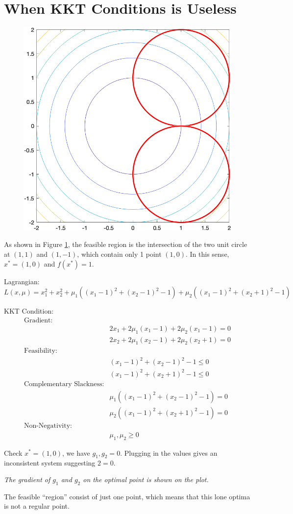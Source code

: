 \section{When KKT Conditions is Useless}
\begin{figure}[h]
    \centering
    \includegraphics[width=0.5\linewidth]{hw7/prob6_plot.png}
    \label{fig:hw7_prob6_circle}
\end{figure}
As shown in Figure \ref{fig:hw7_prob6_circle}, the feasible region is the intersection of the two unit circle at $(1, 1)$ and $(1, -1)$, which contain only 1 point $(1, 0)$. In this sense, $x^*=(1, 0)$ and $f(x^*) = 1$.
\par Lagrangian:
\[
L(x, \mu) = x_1^2 + x_2^2 + \mu_1((x_1 -1)^2 + (x_2 - 1)^2 - 1) + \mu_2((x_1 -1)^2 + (x_2 + 1)^2 - 1)
\]
\par KKT Condition:
\begin{align*}
\text{Gradient:}&\\
&2x_1 + 2\mu_1(x_1 - 1) + 2\mu_2 (x_1 - 1) = 0 \\
&2x_2 + 2\mu_1(x_2 - 1) + 2\mu_2(x_2 + 1) = 0 \\
\text{Feasibility:}&\\
&(x_1 -1)^2 + (x_2 - 1)^2 - 1 \leq 0\\
&(x_1 -1)^2 + (x_2 + 1)^2 - 1 \leq 0\\
\text{Complementary Slackness:}&\\
&\mu_1((x_1 -1)^2 + (x_2 - 1)^2 - 1) = 0\\
&\mu_2((x_1 -1)^2 + (x_2 + 1)^2 - 1) = 0 \\
\text{Non-Negativity:}&\\
&\mu_1, \mu_2 \geq 0
\end{align*}

Check $x^* = (1, 0)$, we have $g_1, g_2 = 0$. Plugging in the values gives an inconsistent system suggesting $2 = 0$. 
\par \textit{The gradient of $g_1$ and $g_2$ on the optimal point is shown on the plot.}
\par The feasible ``region'' consist of just one point, which means that this lone optima is not a regular point. 



